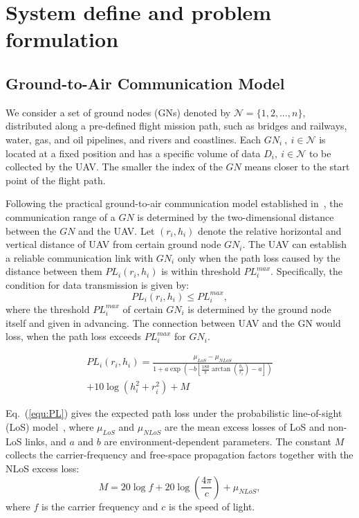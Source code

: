 
\section{System define and problem formulation}
\label{sec:systemmodel}
 
\subsection{Ground-to-Air Communication Model}

We consider a set of ground nodes (GNs) denoted by $\mathcal{N} = \{1, 2, \dots, n\}$, distributed along a pre-defined flight mission path,  such as bridges and railways, water, gas, and oil pipelines, and rivers and coastlines. 
Each  $GN_i \ ,\ i\in \mathcal{N}$ is located at a fixed position and has a specific volume of data $D_i,\ i\in \mathcal{N} $ to be collected by the UAV.
The smaller the index of the $GN$ means closer to the start point of the flight path.

Following the practical ground-to-air communication model established in~\cite{CommunicationModel}, the communication range of a $GN$ is determined by the two-dimensional distance between the $GN$ and the UAV. 
Let $(r_{i},h_{i})$ denote the relative horizontal and vertical distance of UAV from certain ground node $GN_i$.
The UAV can establish a reliable communication link with $GN_i$ only when the path loss caused by the distance between them $PL_i(r_i,h_i)$ is within threshold $PL^{max}_i$.
Specifically, the condition for data transmission is given by:
$$PL_i(r_i,h_i) \leq PL^{max}_i, $$ 
where the threshold $PL^{max}_i$ of certain $GN_i$ is determined by the ground node itself and given in advancing. 
The connection between UAV and the GN would loss, when the path loss exceeds $PL^{max}_i$ for $GN_i$. 

\begin{multline}
    PL_i(r_i,h_i)
    =\frac{\mu_{LoS}-\mu_{NLoS}}
    {1+a \exp(-b[\frac{180}{\pi}\arctan(\frac{h_{i}}{r_{i}})-a])} \\
    +10 \log(h_{i}^2+r_{i}^2)+M
    \label{equ:PL}
\end{multline}

Eq.~(\ref{equ:PL}) gives the expected path loss under the probabilistic line-of-sight (LoS) model~\cite{CommunicationModel}, where $\mu_{LoS}$ and $\mu_{NLoS}$ are the mean excess losses of LoS and non-LoS links, and $a$ and $b$ are environment-dependent parameters.
The constant $M$ collects the carrier-frequency and free-space propagation factors together with the NLoS excess loss:
\begin{equation}
    M=20\log f+20\log\left(\frac{4\pi}{c}\right)+\mu_{NLoS},
    \label{equ:M}
\end{equation}
where $f$ is the carrier frequency and $c$ is the speed of light.

